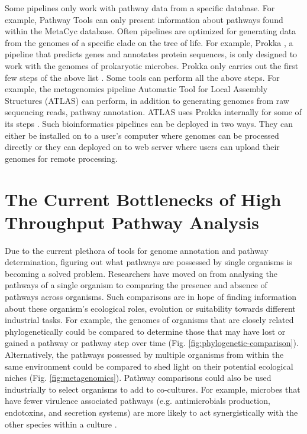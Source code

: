Some pipelines only work with pathway data from a specific database. For example, Pathway Tools \cite{karp2002pathway} can only present information about pathways found within the MetaCyc \cite{karp2002metacyc} database. Often pipelines are optimized for generating data from the genomes of a specific clade on the tree of life. For example, Prokka \cite{seemann2014prokka}, a pipeline that predicts genes and annotates protein sequences, is only designed to work with the genomes of prokaryotic microbes. Prokka only carries out the first few steps of the above list \cite{seemann2014prokka}. Some tools can perform all the above steps. For example, the metagenomics pipeline Automatic Tool for Local Assembly Structures (ATLAS) \cite{white2017atlas,kieser2019atlas} can perform, in addition to generating genomes from raw sequencing reads, pathway annotation. ATLAS uses Prokka internally for some of its steps \cite{white2017atlas,kieser2019atlas}. Such bioinformatics pipelines can be deployed in two ways. They can either be installed on to a user's computer where genomes can be processed directly or they can deployed on to web server where users can upload their genomes for remote processing.

\section{The Current Bottlenecks of High Throughput Pathway Analysis}

Due to the current plethora of tools for genome annotation and pathway determination, figuring out what pathways are possessed by single organisms is becoming a solved problem. Researchers have moved on from analysing the pathways of a single organism to comparing the presence and absence of pathways across organisms. Such comparisons are in hope of finding information about these organism's ecological roles, evolution or suitability towards different industrial tasks. For example, the genomes of organisms that are closely related phylogenetically could be compared to determine those that may have lost or gained a pathway or pathway step over time (Fig. \ref{fig:phylogenetic-comparison}). Alternatively, the pathways possessed by multiple organisms from within the same environment could be compared to shed light on their potential ecological niches (Fig. \ref{fig:metagenomics}). Pathway comparisons could also be used industrially to select organisms to add to co-cultures. For example, microbes that have fewer virulence associated pathways (e.g. antimicrobials production, endotoxins, and secretion systems) are more likely to act synergistically with the other species within a culture \cite{mamat2015detoxifying}.

